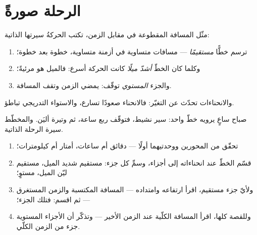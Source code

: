 \section{الرحلة صورةً}

\begin{proposition}\label{prop:g7:motion-average-speed:graphs}
مثّل المسافة المقطوعة في مقابل الزمن، تكتب الحركةُ سيرتها
الذاتية:
\begin{enumerate}
  \item {} ترسم خطًّا \emph{مستقيمًا} --- مسافات
        متساوية في أزمنة متساوية، خطوة بعد خطوة؛
  \item وكلما كان الخطّ \emph{أشدّ ميلًا} كانت الحركة أسرع:
        فالميل هو  مرئيةً؛
  \item والجزء \emph{المستوي} توقّف: يمضي الزمن وتقف المسافة.
\end{enumerate}
والانحناءات تحدّث عن التغيّر: فالانحناء صعودًا تسارع، والاستواء
التدريجي تباطؤ.
\end{proposition}

\begin{omfigure}

{\small صباح ساعٍ يرويه خطّ واحد: سير نشيط، فتوقّف ربع ساعة، ثم
وتيرة أليَن. والمخطّط سيرة الرحلة الذاتية.}
\end{omfigure}

\begin{method}\label{met:g7:motion-average-speed:read}
\begin{enumerate}
  \item تحقّق من المحورين ووحدتيهما أولًا --- دقائق أم ساعات،
        أمتار أم كيلومترات؛
  \item قسّم الخطّ عند انحناءاته إلى أجزاء، وسمِّ كل جزء:
        مستقيم شديد الميل، مستقيم ليّن الميل، مستوٍ؛
  \item ولأيّ جزء مستقيم، اقرأ ارتفاعه وامتداده --- المسافة
        المكتسبة والزمن المستغرق --- ثم اقسم: فتلك  الجزء؛
  \item وللقصة كلها، اقرأ المسافة الكلّية عند الزمن الأخير ---
        وتذكّر أن الأجزاء المستوية جزء من الزمن الكلّي.
\end{enumerate}
\end{method}

